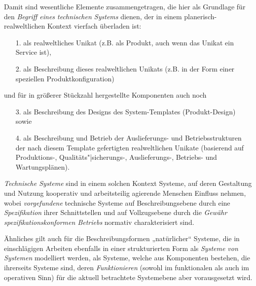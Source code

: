 \documentclass[12pt,a4paper]{article}
\begin{document}
Damit sind wesentliche Elemente zusammengetragen, die hier als Grundlage für
den \emph{Begriff eines technischen Systems} dienen, der in einem
planerisch-realweltlichen Kontext vierfach überladen ist:
\newpage
\begin{itemize}
\item [1.] als realweltliches Unikat (z.B. als Produkt, auch wenn das Unikat
  ein Service ist),
\item [2.] als Beschreibung dieses realweltlichen Unikats (z.B. in der Form
  einer speziellen Produktkonfiguration)
\end{itemize}
und für in größerer Stückzahl hergestellte Komponenten auch noch
\begin{itemize}
\item [3.] als Beschreibung des Designs des System-Templates (Produkt-Design)
  sowie
\item [4.] als Beschreibung und Betrieb der Auslieferungs- und
  Betriebsstrukturen der nach diesem Template gefertigten realweltlichen
  Unikate (basierend auf Produktions-, Qualitäts"|sicherungs-, Auslieferungs-,
  Betriebs- und Wartungsplänen).
\end{itemize}

\emph{Technische Systeme} sind in einem solchen Kontext Systeme, auf deren
Gestaltung und Nutzung kooperativ und arbeitsteilig agierende Menschen
Einfluss nehmen, wobei \emph{vorgefundene} technische Systeme auf
Beschreibungsebene durch eine \emph{Spezifikation} ihrer Schnittstellen und
auf Vollzugsebene durch die \emph{Gewähr spezifikationskonformen Betriebs}
normativ charakterisiert sind.

Ähnliches gilt auch für die Beschreibungsformen „natürlicher“ Systeme, die in
einschlägigen Arbeiten ebenfalls in einer strukturierten Form als
\emph{Systeme von Systemen} modelliert werden, als Systeme, welche aus
Komponenten bestehen, die ihrerseits Systeme sind, deren \emph{Funktionieren}
(sowohl im funktionalen als auch im operativen Sinn) für die aktuell
betrachtete Systemebene aber vorausgesetzt wird.
\end{document}

